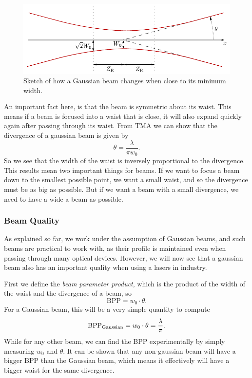 \documentclass[a4paper, 11pt, notitlepage, english]{article}
\begin{document}
\begin{figure}[htpb]
\centering
\includegraphics[width=\textwidth]{beam.pdf}	
\caption{Sketch of how a Gaussian beam changes when close to its minimum width. \label{fig:gaussian_beam}}
\end{figure}

An important fact here, is that the beam is symmetric about its waist. This means if a beam is focused into a waist that is close, it will also expand quickly again after passing through its waist. From TMA we can show that the divergence of a gaussian beam is given by
$$\theta = \frac{\lambda}{\pi w_0}.$$
So we see that the width of the waist is inversely proportional to the divergence. This results mean two important things for beams. If we want to focus a beam down to the smallest possible point, we want a small waist, and so the divergence must be as big as possible. But if we want a beam with a small divergence, we need to have a wide a beam as possible.

\subsubsection{Beam Quality}

As explained so far, we work under the assumption of Gaussian beams, and such beams are practical to work with, as their profile is maintained even when passing through many optical devices. However, we will now see that a gaussian beam also has an important quality when using a lasers in industry.

First we define the \emph{beam parameter product}, which is the product of the width of the waist and the divergence of a beam, so 
$$\mbox{BPP} = w_0\cdot\theta.$$
For a Gaussian beam, this will be a very simple quantity to compute
$$\mbox{BPP}_{\rm Gaussian} = w_0\cdot\theta = \frac{\lambda}{\pi}.$$
While for any other beam, we can find the BPP experimentally by simply measuring $w_0$ and $\theta$. It can be shown that any non-gaussian beam will have a bigger BPP than the Gaussian beam, which means it effectively will have a bigger waist for the same divergence.
\end{document}
